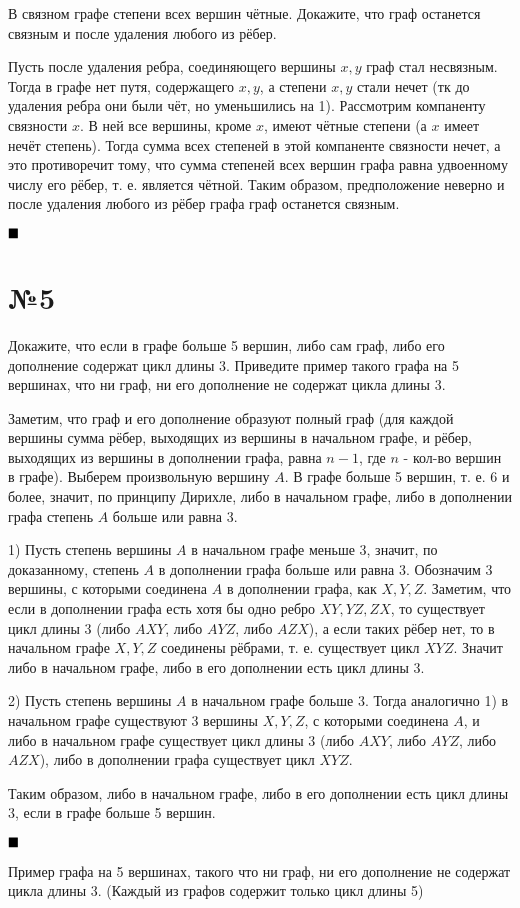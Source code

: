 \documentclass[a4paper, 16pt]{article}
\newenvironment{proof}[1][Доказательство]{%
	\begin{trivlist}
		\item[\hskip \labelsep {\bfseries #1:}]
		\item \hspace{14pt}
	}{
		$ \hfill\blacksquare $
	\end{trivlist}
	\hfill\break
}
\begin{document}
			В связном графе степени всех вершин чётные. Докажите, что граф останется связным и после
			удаления любого из рёбер.
			
			\begin{proof}
				Пусть после удаления ребра, соединяющего вершины $x, y$ граф стал несвязным. Тогда в графе нет путя, содержащего $x, y$, а степени $x, y$ стали нечет (тк до удаления ребра они были чёт, но уменьшились на 1). Рассмотрим компаненту связности $x$. В ней все вершины, кроме $x$, имеют чётные степени (а $x$ имеет нечёт степень). Тогда сумма всех степеней в этой компаненте связности нечет, а это противоречит тому, что сумма степеней всех вершин графа равна удвоенному числу его рёбер, т. е. является чётной. Таким образом, предположение неверно и после удаления любого из рёбер графа граф останется связным.
			\end{proof}
	
		\section*{№5}
		
			Докажите, что если в графе больше 5 вершин, либо сам граф, либо его дополнение содержат цикл
			длины 3. Приведите пример такого графа на 5 вершинах, что ни граф, ни его дополнение не содержат
			цикла длины 3.
			
			\begin{proof}
				Заметим, что граф и его дополнение образуют полный граф (для каждой вершины сумма рёбер, выходящих из вершины в начальном графе, и рёбер, выходящих из вершины в дополнении графа, равна $n-1$, где $n$ - кол-во вершин в графе). Выберем произвольную вершину $A$. В графе больше 5 вершин, т. е. 6 и более, значит, по принципу Дирихле, либо в начальном графе, либо в дополнении графа степень $A$ больше или равна 3. 
				
				1) Пусть степень вершины $A$ в начальном графе меньше 3, значит, по доказанному, степень $A$ в дополнении графа больше или равна 3. Обозначим 3 вершины, с которыми соединена $A$ в дополнении графа, как $X, Y, Z$. Заметим, что если в дополнении графа есть хотя бы одно ребро $XY, YZ, ZX$, то существует цикл длины 3 (либо $AXY$, либо $AYZ$, либо $AZX$), а если таких рёбер нет, то в начальном графе $X, Y, Z$ соединены рёбрами, т. е. существует цикл $XYZ$. Значит либо в начальном графе, либо в его дополнении есть цикл длины 3. 
				
				2) Пусть степень вершины $A$ в начальном графе больше 3. Тогда аналогично 1) в начальном графе существуют 3 вершины $X, Y, Z$, с которыми соединена $A$, и либо в начальном графе существует цикл длины 3 (либо $AXY$, либо $AYZ$, либо $AZX$), либо в дополнении графа существует цикл $XYZ$.
				
				Таким образом, либо в начальном графе, либо в его дополнении есть цикл длины 3, если в графе больше 5 вершин. 
			\end{proof}
				Пример графа на 5 вершинах, такого что ни граф, ни его дополнение не содержат цикла длины 3. (Каждый из графов содержит только цикл длины 5)
		
\end{document}
